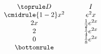 \begin{equation*}
    \begin{array}{c @{\hspace*{1.0cm}} c}\toprule
        D & I \\\cmidrule{1-2}
       x^2 & e^2x \\
       2x & \frac{1}{2} e^{2x} \\      
       2 & \frac{1}{4} e^{2x} \\      
       0 & \frac{1}{8} e^{2x} \\\bottomrule
     \end{array}
\end{equation*}